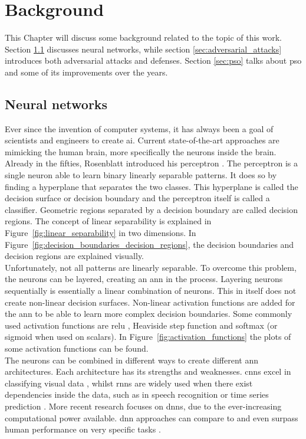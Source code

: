 \chapter{Background}\label{chap:background}
This Chapter will discuss some background related to the topic of this work. Section \ref{sec:neural_networks} discusses neural networks, while section \ref{sec:adversarial_attacks} introduces both adversarial attacks and defenses. Section \ref{sec:pso} talks about \gls{pso} and some of its improvements over the years.\\

\section{Neural networks}\label{sec:neural_networks}
Ever since the invention of computer systems, it has always been a goal of scientists and engineers to create \gls{ai}. Current state-of-the-art approaches are mimicking the human brain, more specifically the neurons inside the brain. Already in the fifties, Rosenblatt introduced his perceptron \cite{rosenblatt_perceptron_1958}. The perceptron is a single neuron able to learn binary linearly separable patterns. It does so by finding a hyperplane that separates the two classes. This hyperplane is called the decision surface or decision boundary and the perceptron itself is called a classifier. Geometric regions separated by a decision boundary are called decision regions. The concept of linear separability is explained in Figure~\ref{fig:linear_separability} in two dimensions. In Figure~\ref{fig:decision_boundaries_decision_regions}, the decision boundaries and decision regions are explained visually. \\

Unfortunately, not all patterns are linearly separable. To overcome this problem, the neurons can be layered, creating an \gls{ann} in the process. Layering neurons sequentially is essentially a linear combination of neurons. This in itself does not create non-linear decision surfaces. Non-linear activation functions are added for the \gls{ann} to be able to learn more complex decision boundaries. Some commonly used activation functions are \gls{relu} \cite{relu}, Heaviside step function \cite{heaviside} and softmax \cite{softmax} (or sigmoid when used on scalars). In Figure~\ref{fig:activation_functions} the plots of some activation functions can be found.\\ 

\newpage
The neurons can be combined in different ways to create different \gls{ann} architectures. Each architecture has its strengths and weaknesses. \glspl{cnn} excel in classifying visual data \cite{face_recognition_survey, cnn_1, cnn_2}, whilst \glspl{rnn} are widely used when there exist dependencies inside the data, such as in speech recognition \cite{speech_1, speech_2} or time series prediction \cite{time_series_1}. More recent research focuses on \glspl{dnn}, due to the ever-increasing computational power available. \gls{dnn} approaches can compare to and even surpass human performance on very specific tasks \cite{alpha_go_google, imagenet_dnn}.\\ 

